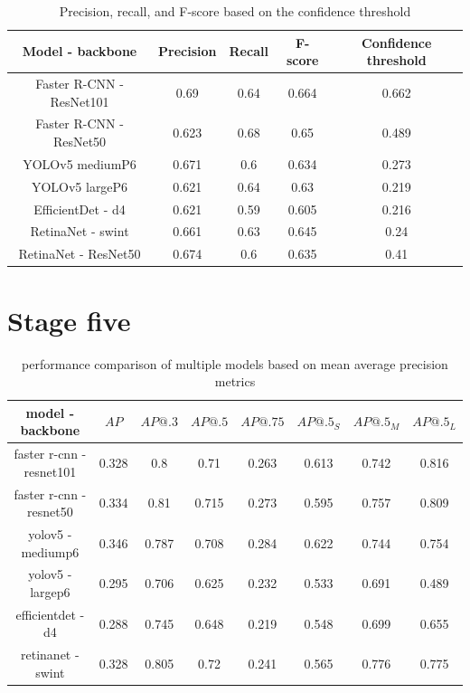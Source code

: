\begin{table}
    \begin{tabular}{c||c|c|c|c}
        Model - backbone         & Precision & Recall & F-score & Confidence threshold \\ \hline \hline
        Faster R-CNN - ResNet101 & 0.69      & 0.64   & 0.664   & 0.662                \\ \hline
        Faster R-CNN - ResNet50  & 0.623     & 0.68   & 0.65    & 0.489                \\ \hline
        YOLOv5 mediumP6          & 0.671     & 0.6    & 0.634   & 0.273                \\ \hline
        YOLOv5 largeP6           & 0.621     & 0.64   & 0.63    & 0.219                \\ \hline
        EfficientDet - d4        & 0.621     & 0.59   & 0.605   & 0.216                \\ \hline
        RetinaNet - swint        & 0.661     & 0.63   & 0.645   & 0.24                 \\ \hline
        RetinaNet - ResNet50     & 0.674     & 0.6    & 0.635   & 0.41                 \\
    \end{tabular}
    \caption{Precision, recall, and F-score based on the confidence threshold}
    \label{tab:model_prf:stage_four}
\end{table}

\section{Stage five}

\begin{table}
    \begin{tabular}{c||c|c|c|c|c|c|c}
        model - backbone         & $AP$  & $AP@.3$ & $AP@.5$ & $AP@.75$ & $AP@.5_S$ & $AP@.5_M$ & $AP@.5_L$ \\ \hline \hline
        faster r-cnn - resnet101 & 0.328 & 0.8     & 0.71    & 0.263    & 0.613     & 0.742     & 0.816     \\ \hline
        faster r-cnn - resnet50  & 0.334 & 0.81    & 0.715   & 0.273    & 0.595     & 0.757     & 0.809     \\ \hline
        yolov5 - mediump6        & 0.346 & 0.787   & 0.708   & 0.284    & 0.622     & 0.744     & 0.754     \\ \hline
        yolov5 - largep6         & 0.295 & 0.706   & 0.625   & 0.232    & 0.533     & 0.691     & 0.489     \\ \hline
        efficientdet - d4        & 0.288 & 0.745   & 0.648   & 0.219    & 0.548     & 0.699     & 0.655     \\ \hline
        retinanet - swint        & 0.328 & 0.805   & 0.72    & 0.241    & 0.565     & 0.776     & 0.775     \\
    \end{tabular}
    \caption{performance comparison of multiple models based on mean average precision metrics}
    \label{tab:model_comparison4k}
\end{table}

